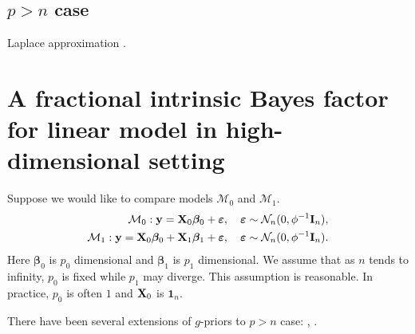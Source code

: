 \documentclass[11pt]{article}
\newcommand{\By}{\mathbf{y}}    \newcommand{\Bz}{\mathbf{z}}
\newcommand{\bfsym}[1]{\ensuremath{\boldsymbol{#1}}}
\def\bbeta{\bfsym \beta}
\theoremstyle{plain}
\theoremstyle{definition}
\theoremstyle{remark}
\begin{document}
\subsection{$p>n$ case}
Laplace approximation \cite{Barber2016}.








\section{A fractional intrinsic Bayes factor for linear model in high-dimensional setting}
Suppose we would like to compare models $\mathcal M_0$ and $\mathcal M_1$.
\begin{align*}
    \mathcal M_0:   \By = \BX_0 \bbeta_0 + \bepsilon,\quad \bepsilon\sim \mathcal N_n(0,\phi^{-1} \BI_n),
    \\
    \mathcal M_1:   \By = \BX_0 \bbeta_0 + \BX_1 \bbeta_1 + \bepsilon,\quad \bepsilon\sim \mathcal N_n(0,\phi^{-1} \BI_n).
\end{align*}
Here $\bbeta_0$ is $p_0$ dimensional and $\bbeta_1$ is $p_1$ dimensional.
We assume that as $n$ tends to infinity, $p_0$ is fixed while $p_1$ may diverge.
This assumption is reasonable.
In practice, $p_0$ is often $1$ and $\mathbf{X}_0$ is $\mathbf 1_n$.

There have been several extensions of $g$-priors to $p>n$ case: \cite{maruyama2011}, \cite{Shang2011}.
\end{document}
